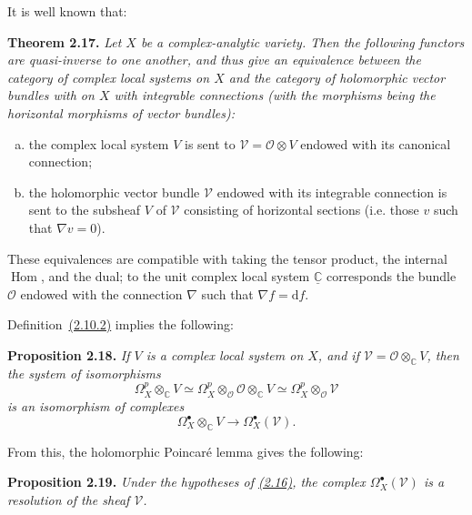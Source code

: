 \documentclass{report}
\newenvironment{itenv}[1]
  {\phantomsection\par\medskip\noindent\textbf{#1.}\itshape}
  {\par\medskip}
\renewcommand{\cal}[1]{{\mathcal{#1}}}
\newcommand{\CC}{\mathbb{C}}
\newcommand{\dd}{\mathrm{d}}
\DeclareMathOperator{\Hom}{Hom}
\newcommand{\oldpage}[1]{\marginpar{\footnotesize$\Big\vert$ \textit{p.~#1}}}
\begin{document}
It is well known that:
\begin{itenv}{Theorem 2.17}
\label{I.2.17}
  Let $X$ be a complex-analytic variety.
  Then the following functors are quasi-inverse to one another, and thus give an equivalence between the category of complex local systems on $X$ and the category of holomorphic vector bundles with on $X$ with integrable connections (with the morphisms being the horizontal morphisms of vector bundles):
  \begin{enumerate}[a)]
    \item the complex local system $V$ is sent to $\cal{V}=\cal{O}\otimes V$ endowed with its canonical connection;
    \item the holomorphic vector bundle $\cal{V}$ endowed with its integrable connection is sent to the subsheaf $V$ of $\cal{V}$ consisting of horizontal sections (i.e. those $v$ such that $\nabla v=0$).
  \end{enumerate}
\end{itenv}

These equivalences are compatible with taking the tensor product, the internal $\Hom$, and the dual;
to the unit complex local system $\underline{\CC}$ corresponds the bundle $\cal{O}$ endowed with the connection $\nabla$ such that $\nabla f=\dd f$.

Definition~\hyperref[I.2.10.2]{(2.10.2)} implies the following:
\begin{itenv}{Proposition 2.18}
\label{I.2.18}
  If $V$ is a complex local system on $X$, and if $\cal{V}=\cal{O}\otimes_\CC V$,
\oldpage{13}
  then the system of isomorphisms
  \[
    \Omega_X^p\otimes_\CC V
    \simeq
    \Omega_X^p\otimes_\cal{O}\cal{O}\otimes_\CC V
    \simeq
    \Omega_X^p\otimes_\cal{O}\cal{V}
  \]
  is an isomorphism of complexes
  \[
    \Omega_X^\bullet\otimes_\CC V \to \Omega_X^\bullet(\cal{V}).
  \]
\end{itenv}
From this, the holomorphic Poincar\'{e} lemma gives the following:
\begin{itenv}{Proposition 2.19}
\label{I.2.19}
  Under the hypotheses of \hyperref[I.2.16]{(2.16)}, the complex $\Omega_X^\bullet(\cal{V})$ is a resolution of the sheaf $\cal{V}$.
\end{itenv}
\end{document}
